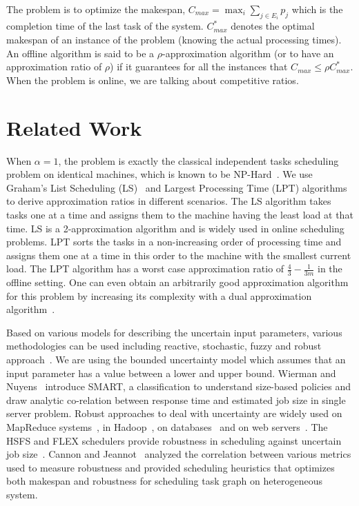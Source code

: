 \documentclass[10pt, conference, compsocconf]{IEEEtran}
\begin{document}
The problem is to optimize the makespan, $C_{max} = \max_i \sum_{j \in
  E_i} p_j$ which is the completion time of the last task of the
system. $C_{max}^{*}$ denotes the optimal makespan of an instance of
the problem (knowing the actual processing times). An offline algorithm is
said to be a $\rho$-approximation algorithm (or to have an
approximation ratio of $\rho$) if it guarantees for all the instances
that $C_{max} \leq \rho C_{max}^*$. When the problem is online, we are
talking about competitive ratios.

\section{Related Work}\label{sec3}

When $\alpha = 1$, the problem is exactly the classical independent
tasks scheduling problem on identical machines, which is known to be
NP-Hard~\cite{GareyJohnson79}. We use Graham's List Scheduling
(LS)~\cite{Graham66} and Largest Processing Time (LPT)
algorithms~\cite{Graham69boundson} to derive approximation ratios in
different scenarios. The LS algorithm takes tasks one at a time and
assigns them to the machine having the least load at that time. LS is a
2-approximation algorithm and is widely used in online scheduling
problems. LPT sorts the tasks in a non-increasing order of processing time and
assigns them one at a time in this order to the machine with the
smallest current load. The LPT algorithm has a worst case approximation
ratio of $\frac{4}{3}-\frac{1}{3m}$ in the offline setting. One can
even obtain an arbitrarily good approximation algorithm for this problem by increasing
its complexity with a dual approximation
algorithm~\cite{Hoch87}.


Based on various models for describing the uncertain input parameters,
various methodologies can be used including reactive, stochastic,
fuzzy and robust approach~\cite{DBLP:journals/cce/LiI08}. We are using
the bounded uncertainty model which assumes that an input parameter
has a value between a lower and upper bound.  Wierman and
Nuyens~\cite{conf/sigmetrics/WiermanN08} introduce SMART, a
classification to understand size-based policies and draw analytic
co-relation between response time and estimated job size in single
server problem. Robust approaches to deal with uncertainty are widely
used on MapReduce
systems~\cite{Kavulya:2010:ATP:1844765.1845224,Verma:2011:AAR:1998582.1998637},
in
Hadoop~\cite{Wolf:2010:FSA:2023718.2023720,White:2009:HDG:1717298},
on databases~\cite{Lipton199518} and on web
servers~\cite{Cardellini99dynamicload}. The HSFS and FLEX schedulers
provide robustness in scheduling against uncertain job
size~\cite{Wolf:2010:FSA:2023718.2023720,6691554}. Cannon and
Jeannot~\cite{cj09c} analyzed the correlation between various metrics
used to measure robustness and provided scheduling heuristics that
optimizes both makespan and robustness for scheduling task graph on
heterogeneous system.
\end{document}
